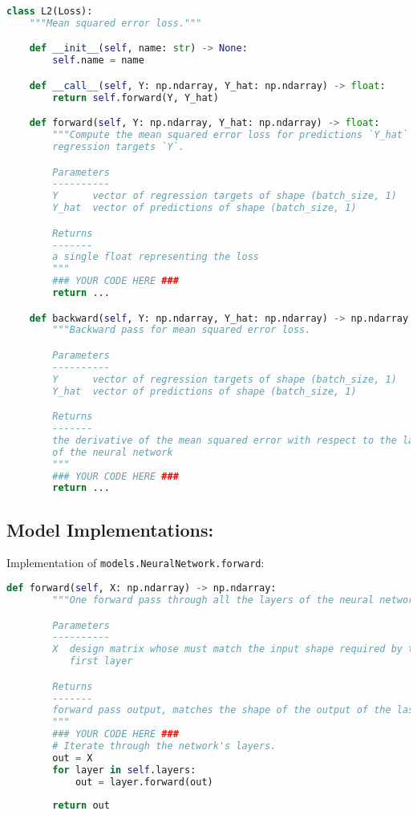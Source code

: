 \begin{lstlisting}[language=Python]
class L2(Loss):
    """Mean squared error loss."""

    def __init__(self, name: str) -> None:
        self.name = name

    def __call__(self, Y: np.ndarray, Y_hat: np.ndarray) -> float:
        return self.forward(Y, Y_hat)

    def forward(self, Y: np.ndarray, Y_hat: np.ndarray) -> float:
        """Compute the mean squared error loss for predictions `Y_hat` given
        regression targets `Y`.

        Parameters
        ----------
        Y      vector of regression targets of shape (batch_size, 1)
        Y_hat  vector of predictions of shape (batch_size, 1)

        Returns
        -------
        a single float representing the loss
        """
        ### YOUR CODE HERE ###
        return ...

    def backward(self, Y: np.ndarray, Y_hat: np.ndarray) -> np.ndarray:
        """Backward pass for mean squared error loss.

        Parameters
        ----------
        Y      vector of regression targets of shape (batch_size, 1)
        Y_hat  vector of predictions of shape (batch_size, 1)

        Returns
        -------
        the derivative of the mean squared error with respect to the last layer
        of the neural network
        """
        ### YOUR CODE HERE ###
        return ...

\end{lstlisting}


\subsection{Model Implementations:}

Implementation of \texttt{models.NeuralNetwork.forward}:

\begin{lstlisting}[language=Python]
    def forward(self, X: np.ndarray) -> np.ndarray:
        """One forward pass through all the layers of the neural network.

        Parameters
        ----------
        X  design matrix whose must match the input shape required by the
           first layer

        Returns
        -------
        forward pass output, matches the shape of the output of the last layer
        """
        ### YOUR CODE HERE ###
        # Iterate through the network's layers.
        out = X
        for layer in self.layers:
            out = layer.forward(out)
        
        return out

\end{lstlisting}

